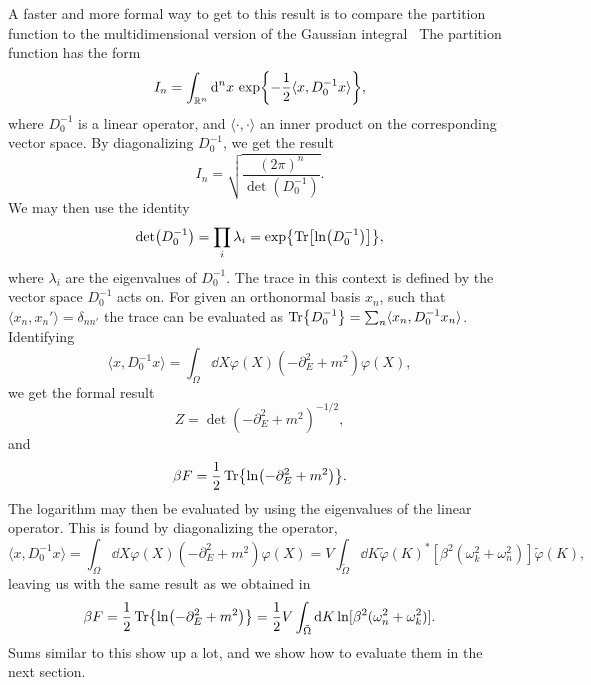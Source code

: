 A faster and more formal way to get to this result is to compare the partition function to the multidimensional version of the Gaussian integral~
The partition function has the form 
\begin{equation*}
    I_n = \int_{\mathbb{R}^n} \dd^n x\, \exp{- \frac{1}{2} \langle x, D_0^{-1} x\rangle },
\end{equation*}
where $D_0^{-1}$ is a linear operator, and $\langle \cdot , \cdot \rangle$ an inner product on the corresponding vector space.
By diagonalizing $D_0^{-1}$, we get the result
\begin{equation*}
    I_n = \sqrt{\frac{(2 \pi)^n}{\det(D_0^{-1})}}.
\end{equation*}
We may then use the identity
\begin{equation}
    \label{lndettrln}
    \det(D_0^{-1}) = \prod_i \lambda_i = \exp{\Tr[\ln(D_0^{-1})]},
\end{equation}
where $\lambda_i$ are the eigenvalues of $D_0^{-1}$.
The trace in this context is defined by the vector space $D_0^{-1}$ acts on.
For given an orthonormal basis $x_n$, such that $\langle x_n, x_n'\rangle = \delta_{nn'}$ the trace can be evaluated as $\Tr{D_0^{-1}} = \sum_n \langle x_n, D_0^{-1} x_n \rangle$.
Identifying 
\begin{equation*}
    \langle x, D_0^{-1} x\rangle = \int_\Omega \dd X \varphi(X)\left(-\partial_E^2+m^2\right)\varphi(X),
\end{equation*}
we get the formal result
\begin{equation*}
    Z = \det(-\partial_E^2 + m^2)^{-1/2},
\end{equation*}
and 
\begin{equation*}
    \beta F = \frac{1}{2}\Tr{\ln(-\partial_E^2 + m^2)}.
\end{equation*}
The logarithm may then be evaluated by using the eigenvalues of the linear operator.
This is found by diagonalizing the operator,
\begin{equation*}
    \langle x, D_0^{-1} x \rangle 
    = \int_\Omega \dd X \varphi(X)\left(-\partial_E^2+m^2\right)\varphi(X)
    = V  \int_{\tilde \Omega} \dd K 
    \tilde \varphi(K)^* [\beta^2(\omega_k^2 +\omega_n^2)] \tilde \varphi(K),
\end{equation*}
leaving us with the same result as we obtained in 
\begin{equation*}
    \beta F 
    = \frac{1}{2} \Tr{\ln(-\partial_E^2 + m^2)} 
    = \frac{1}{2} V \int_{\tilde \Omega} \dd K \ln[\beta^2(\omega_n^2 + \omega_k^2)].
\end{equation*}
Sums similar to this show up a lot, and we show how to evaluate them in the next section.
